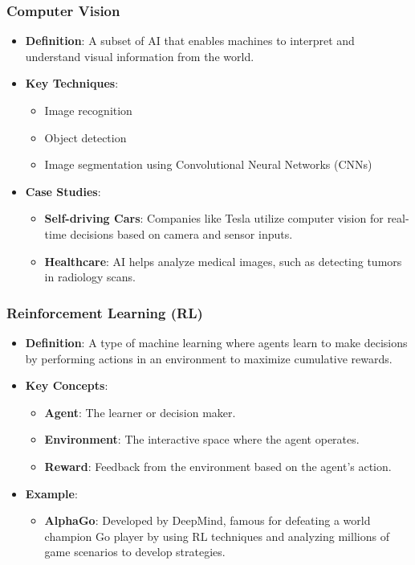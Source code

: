 \documentclass[aspectratio=169]{beamer}
\begin{document}
\begin{frame}[fragile]
    \frametitle{Computer Vision}
    \begin{itemize}
        \item \textbf{Definition}: A subset of AI that enables machines to interpret and understand visual information from the world.
        \item \textbf{Key Techniques}: 
        \begin{itemize}
            \item Image recognition
            \item Object detection
            \item Image segmentation using Convolutional Neural Networks (CNNs)
        \end{itemize}
        \item \textbf{Case Studies}:
            \begin{itemize}
                \item \textbf{Self-driving Cars}: Companies like Tesla utilize computer vision for real-time decisions based on camera and sensor inputs.
                \item \textbf{Healthcare}: AI helps analyze medical images, such as detecting tumors in radiology scans.
            \end{itemize}
    \end{itemize}
\end{frame}

\begin{frame}[fragile]
    \frametitle{Reinforcement Learning (RL)}
    \begin{itemize}
        \item \textbf{Definition}: A type of machine learning where agents learn to make decisions by performing actions in an environment to maximize cumulative rewards.
        \item \textbf{Key Concepts}: 
        \begin{itemize}
            \item \textbf{Agent}: The learner or decision maker.
            \item \textbf{Environment}: The interactive space where the agent operates.
            \item \textbf{Reward}: Feedback from the environment based on the agent's action.
        \end{itemize}
        \item \textbf{Example}:
            \begin{itemize}
                \item \textbf{AlphaGo}: Developed by DeepMind, famous for defeating a world champion Go player by using RL techniques and analyzing millions of game scenarios to develop strategies.
            \end{itemize}
    \end{itemize}
\end{frame}
\end{document}
